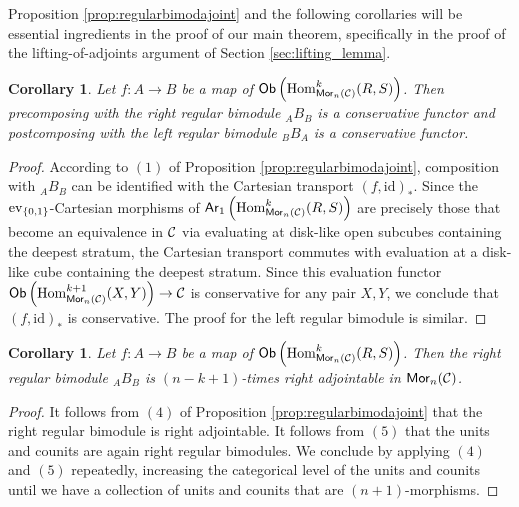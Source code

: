\documentclass[10pt, reqno, twoside
, final
]{amsart}
\numberwithin{equation}{subsection}%
\theoremstyle{definition}
\theoremstyle{definition}
\theoremstyle{definition}
\theoremstyle{definition}
\theoremstyle{definition}
\theoremstyle{definition}
\theoremstyle{definition}
\theoremstyle{definition}
\theoremstyle{definition}
\theoremstyle{plain}
\theoremstyle{definition}
\theoremstyle{plain}
\theoremstyle{definition}
\theoremstyle{plain}
\newtheorem{cor}[defn]{Corollary}
\theoremstyle{definition}
\theoremstyle{definition}
\theoremstyle{plain}
\theoremstyle{plain}
\theoremstyle{definition}
\theoremstyle{plain}
\theoremstyle{plain}
\theoremstyle{plain}
\begin{document}
Proposition \ref{prop:regularbimodajoint} and the following corollaries will be essential ingredients in the proof of our main theorem, specifically in the proof of the lifting-of-adjoints argument of Section \ref{sec:lifting_lemma}.
\begin{cor}\label{cor:regbimodconservative}
Let $f:A\rightarrow B$ be a map of $\mathsf{Ob}\left(\mathrm{Hom}^k_{\mathsf{Mor}_n(\mathcal{C})}(R,S)\right)$. Then precomposing with the right regular bimodule ${}_AB_B$ is a conservative functor and postcomposing with the left regular bimodule ${}_BB_A$ is a conservative functor.
\end{cor}
\begin{proof}
According to $(1)$ of Proposition \ref{prop:regularbimodajoint}, composition with ${}_AB_B$ can be identified with the Cartesian transport $(f,\mathrm{id})_*$. Since the $\mathrm{ev}_{\{0,1\}}$-Cartesian morphisms of $\mathsf{Ar}_1\left(\mathrm{Hom}^k_{\mathsf{Mor}_n(\mathcal{C})}(R,S)\right)$ are precisely those that become an equivalence in $\mathcal{C}$ via evaluating at disk-like open subcubes containing the deepest stratum, the Cartesian transport commutes with evaluation at a disk-like cube containing the deepest stratum. Since this evaluation functor $\mathsf{Ob}\left(\mathrm{Hom}^{k+1}_{\mathsf{Mor}_n(\mathcal{C})}(X,Y)\right)\rightarrow \mathcal{C}$ is conservative for any pair $X,Y$, we conclude that $(f,\mathrm{id})_*$ is conservative. The proof for the left regular bimodule is similar. 
 \end{proof}
\begin{cor}\label{cor:regular-bimod-dualizability}
Let $f:A\rightarrow B$ be a map of $\mathsf{Ob}\left(\mathrm{Hom}^k_{\mathsf{Mor}_n(\mathcal{C})}(R,S)\right)$. Then the right regular bimodule ${}_AB_B$ is $(n-k+1)$-times right adjointable in $\mathsf{Mor}_n(\mathcal{C})$.     
\end{cor}
\begin{proof}
It follows from $(4)$ of Proposition \ref{prop:regularbimodajoint} that the right regular bimodule is right adjointable. It follows from $(5)$ that the units and counits are again right regular bimodules. We conclude by applying $(4)$ and $(5)$ repeatedly, increasing the categorical level of the units and counits until we have a collection of units and counits that are $(n+1)$-morphisms. 
\end{proof}
\end{document}
